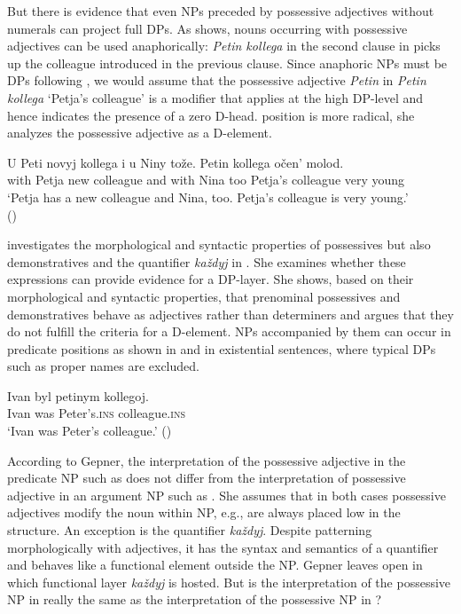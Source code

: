 \documentclass[output=paper]{langscibook}
\begin{document}
\noindent But there is evidence that even NPs preceded by possessive adjectives without numerals can project full DPs. As  shows, nouns occurring with possessive adjectives can be used anaphorically: \textit{Petin kollega} in the second clause in  picks up the colleague introduced in the previous clause. Since anaphoric NPs must be DPs following \citet{Kagan.Pereltsvaig2014}, we would assume that the possessive adjective \textit{Petin} in \textit{Petin kollega} `Petja's colleague' is a modifier that applies at the high DP-level and hence indicates the presence of a zero D-head.  position is more radical, she analyzes the possessive adjective as a D-element.


\ea \label{ex:4}
\gll U Peti novyj kollega i u Niny tože. Petin kollega očen' molod. \\
    with Petja new colleague and with Nina too Petja's colleague very young\\
\glt `Petja has a new colleague and Nina, too. Petja's colleague is very young.'\\
\glt \hfill ()
\z

\noindent {} investigates the morphological and syntactic properties of possessives but also demonstratives and the quantifier \textit{každyj} in . She examines whether these expressions can provide evidence for a DP-layer. She shows, based on their morphological and syntactic properties, that prenominal possessives and demonstratives behave as adjectives rather than determiners and argues that they do not fulfill the criteria for a D-element. NPs accompanied by them can occur in predicate positions as shown in  and in existential sentences, where typical DPs such as proper names are excluded.

\ea \label{ex:5}
\gll Ivan byl petinym kollegoj. \\
    Ivan was Peter's.\textsc{ins} colleague.\textsc{ins}\\
\glt `Ivan was Peter’s colleague.' \hfill ()
\z

\noindent According to Gepner, the interpretation of the possessive adjective in the predicate NP such as  does not differ from the interpretation of possessive adjective in an argument NP such as . She assumes that in both cases possessive adjectives modify the noun within NP, e.g., are always placed low in the structure. An exception is the quantifier \textit{každyj}. Despite patterning morphologically with adjectives, it has the syntax and semantics of a quantifier and behaves like a functional element outside the NP. Gepner leaves open in which functional layer \textit{každyj} is hosted. But is the interpretation of the possessive NP in  really the same as the interpretation of the possessive NP in ?
\end{document}
